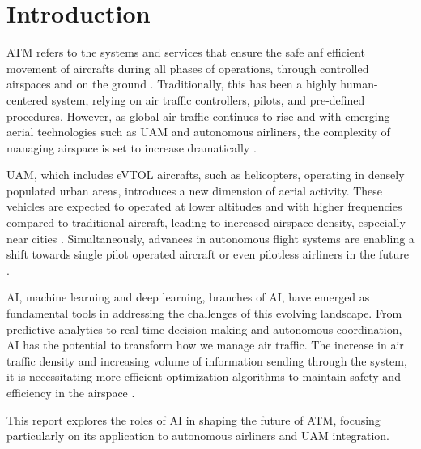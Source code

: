 \section{Introduction}


\Gls{ATM} refers to the systems and services that ensure the safe anf efficient movement of aircrafts during all phases of operations, through controlled airspaces and on the ground \cite{skybraryATM}. 
Traditionally, this has been a highly human-centered system, relying on air traffic controllers, pilots, and pre-defined procedures.
However, as global air traffic continues to rise and with emerging aerial technologies such as \gls{UAM} and autonomous airliners, the complexity of managing airspace is set to increase dramatically \cite{Schuchardt_2023}.

\gls{UAM}, which includes \gls{eVTOL} aircrafts, such as helicopters, operating in densely populated urban areas, introduces a new dimension of aerial activity.
These vehicles are expected to operated at lower altitudes and with higher frequencies compared to traditional aircraft, leading to increased airspace density, especially near cities \cite{Schuchardt_2023}.
Simultaneously, advances in autonomous flight systems are enabling a shift towards single pilot operated aircraft or even pilotless airliners in the future \cite{Vance_2019}.

\gls{AI}, machine learning and deep learning, branches of \gls{AI}, have emerged as fundamental tools in addressing the challenges of this evolving landscape.
From predictive analytics to real-time decision-making and autonomous coordination, \gls{AI} has the potential to transform how we manage air traffic.
The increase in air traffic density and increasing volume of information sending through the system, it is necessitating more efficient optimization algorithms to maintain safety and efficiency in the airspace \cite{Tafur_2025}.

This report explores the roles of \gls{AI} in shaping the future of \gls{ATM}, focusing particularly on its application to autonomous airliners and \gls{UAM} integration.